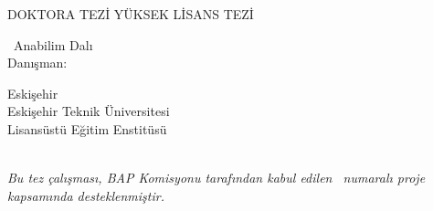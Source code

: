 \begin{spacing}{1.0}
\begin{center}
	
\bf
\paramtitle
\vspace{8\baselineskip}

\paramauthor
\vspace{8\baselineskip}

\if{}
DOKTORA TEZİ
\else
YÜKSEK LİSANS TEZİ
\fi
\bigskip

\paramdepttr~Anabilim Dalı \\
Danışman: \paramsupervisor
\vspace{3\baselineskip}

Eskişehir \\
Eskişehir Teknik Üniversitesi \\
Lisansüstü Eğitim Enstitüsü \\
\parammonthtr~\paramyear

\end{center}
\end{spacing}
\vspace{8\baselineskip}

\ifdefined\parambap
\textit{Bu tez çalışması, BAP Komisyonu tarafından kabul edilen \parambap~numaralı proje kapsamında desteklenmiştir.}
\fi

\newpage
